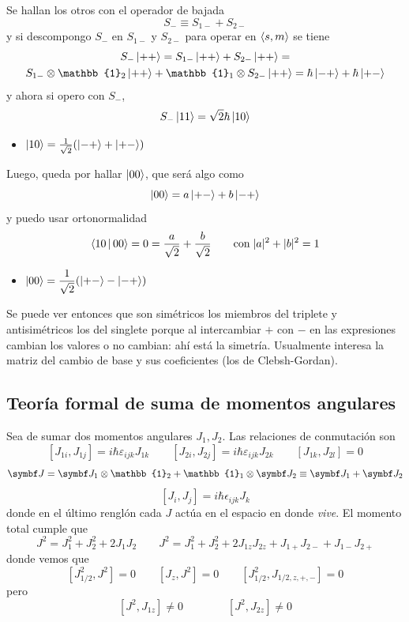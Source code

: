 \documentclass[10pt,oneside]{CBFT_book}
\begin{document}
Se hallan los otros con el operador de bajada
\[
	S_- \equiv S_{1-} + S_{2-}
\]
y si descompongo $S_-$ en $S_{1-}$ y $S_{2-}$ para operar en $\Braket{s,m}$ se tiene 
\begin{multline*}
	S_- \Ket{++} = S_{1-}\Ket{++} + S_{2-}\Ket{++} = \\
	S_{1-}\otimes\mathbb{1}_2\Ket{++} + \mathbb{1}_1\otimes S_{2-}\Ket{++} = 
	\hbar\Ket{-+} + \hbar\Ket{+-} 
\end{multline*}
y ahora si opero con $S_-$,
\[
	S_-\Ket{11} = \sqrt{2} \hbar \Ket{10}
\]
\begin{itemize}
	\item $\Ket{10} = \frac{1}{\sqrt{2}}( \Ket{-+} + \Ket{+-} ) $
\end{itemize}

Luego, queda por hallar $\Ket{00}$, que será algo como 
\[
	\Ket{00} = a \Ket{+-} + b\Ket{-+}
\]
y puedo usar ortonormalidad 
\[
	\Braket{10|00} = 0 = \frac{a}{\sqrt{2}} + \frac{b}{\sqrt{2}} \qquad \text{con} \; |a|^2 + |b|^2 = 1
\]
\begin{itemize}
	\item $\displaystyle \Ket{00} = \frac{1}{\sqrt{2}}( \Ket{+-} - \Ket{-+} ) $
\end{itemize}

Se puede ver entonces que son simétricos los miembros del triplete y antisimétricos los del
singlete porque al intercambiar $+$ con $-$ en las expresiones cambian los valores o no cambian:
ahí está la simetría.
Usualmente interesa la matriz del cambio de base y sus coeficientes (los de Clebsh-Gordan).


\subsection{Teoría formal de suma de momentos angulares}

Sea de sumar dos momentos angulares $J_1, J_2$. Las relaciones de conmutación son
\[
	[J_{1i},J_{1j}] = i\hbar \varepsilon_{ijk}J_{1k} \qquad 
	[J_{2i},J_{2j}] = i\hbar \varepsilon_{ijk}J_{2k} \qquad
	[J_{1k},J_{2l}] = 0
\]
\[
	\vb{J} = \vb{J}_1 \otimes \mathbb{1}_2 + \mathbb{1}_1\otimes \vb{J}_2 
	\equiv \vb{J}_1 + \vb{J}_2
\]
\[
	[J_i, J_j] = i\hbar\epsilon_{ijk}J_k
\]
donde en el último renglón cada $J$ actúa en el espacio en donde {\it vive}.
El momento total  cumple que 
\[
	J^2 =  J_1^2 + J_2^2 + 2J_1J_2 \qquad 
	J^2 =  J_1^2 + J_2^2 + 2J_{1z}J_{2z} + J_{1+}J_{2-} + J_{1-}J_{2+}
\]
donde vemos que 
\[
	[J^2_{1/2},J^2] = 0 \qquad [J_z,J^2] = 0 \qquad [J^2_{1/2},J_{1/2,z,+,-}] = 0
\]
pero 
\[
	[ J^2 , J_{1z}] \neq 0  \qquad \qquad [ J^2 , J_{2z}] \neq 0
\]
\end{document}

